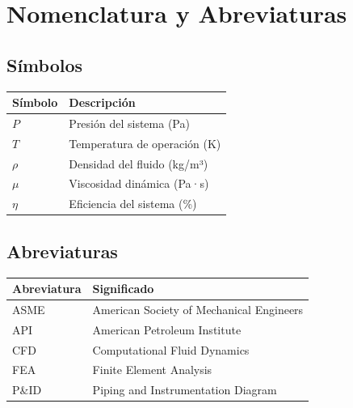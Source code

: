 \section*{Nomenclatura y Abreviaturas}

\subsection*{Símbolos}
\begin{tabularx}{\textwidth}{@{}lX@{}}
	\toprule
	\textbf{Símbolo} & \textbf{Descripción} \\
	\midrule
	$P$ & Presión del sistema (Pa) \\
	$T$ & Temperatura de operación (K) \\
	$\rho$ & Densidad del fluido (kg/m³) \\
	$\mu$ & Viscosidad dinámica (Pa·s) \\
	$\eta$ & Eficiencia del sistema (\%) \\
	\bottomrule
\end{tabularx}

\vspace{1cm}

\subsection*{Abreviaturas}
\begin{tabularx}{\textwidth}{@{}lX@{}}
	\toprule
	\textbf{Abreviatura} & \textbf{Significado} \\
	\midrule
	ASME & American Society of Mechanical Engineers \\
	API & American Petroleum Institute \\
	CFD & Computational Fluid Dynamics \\
	FEA & Finite Element Analysis \\
	P\&ID & Piping and Instrumentation Diagram \\
	\bottomrule
\end{tabularx}

\newpage